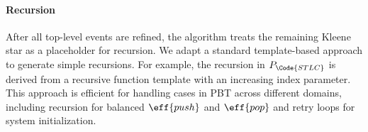 \paragraph{Recursion} After all top-level events are refined, the algorithm treats the remaining Kleene star as a placeholder for recursion. We adapt a standard template-based approach to generate simple recursions. For example, the recursion in $P_\Code{STLC}$ is derived from a recursive function template with an increasing index parameter. This approach is efficient for handling cases in PBT across different domains, including recursion for balanced $\eff{push}$ and $\eff{pop}$ and retry loops for system initialization.


